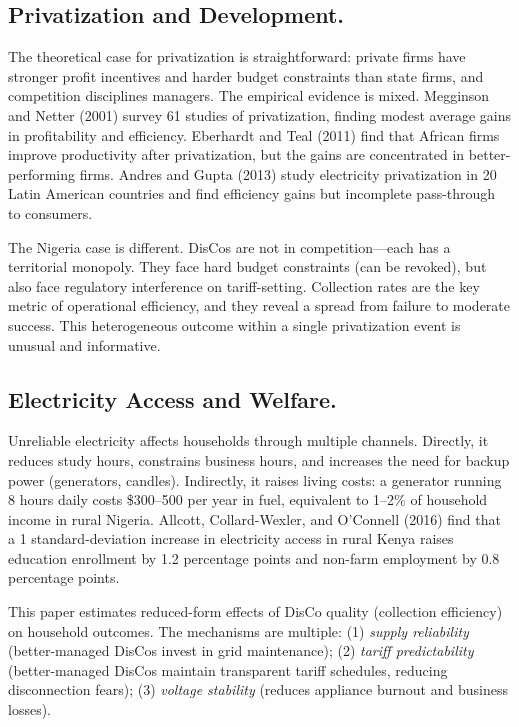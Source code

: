 \documentclass[12pt]{article}
\begin{document}
\subsection*{Privatization and Development.}
The theoretical case for privatization is straightforward: private firms have stronger profit incentives and harder budget constraints than state firms, and competition disciplines managers. The empirical evidence is mixed. Megginson and Netter (2001) survey 61 studies of privatization, finding modest average gains in profitability and efficiency. Eberhardt and Teal (2011) find that African firms improve productivity after privatization, but the gains are concentrated in better-performing firms. Andres and Gupta (2013) study electricity privatization in 20 Latin American countries and find efficiency gains but incomplete pass-through to consumers.

The Nigeria case is different. DisCos are not in competition---each has a territorial monopoly. They face hard budget constraints (can be revoked), but also face regulatory interference on tariff-setting. Collection rates are the key metric of operational efficiency, and they reveal a spread from failure to moderate success. This heterogeneous outcome within a single privatization event is unusual and informative.

\subsection*{Electricity Access and Welfare.}
Unreliable electricity affects households through multiple channels. Directly, it reduces study hours, constrains business hours, and increases the need for backup power (generators, candles). Indirectly, it raises living costs: a generator running 8 hours daily costs \$300--500 per year in fuel, equivalent to 1--2\% of household income in rural Nigeria. Allcott, Collard-Wexler, and O'Connell (2016) find that a 1 standard-deviation increase in electricity access in rural Kenya raises education enrollment by 1.2 percentage points and non-farm employment by 0.8 percentage points.

This paper estimates reduced-form effects of DisCo quality (collection efficiency) on household outcomes. The mechanisms are multiple: (1) \textit{supply reliability} (better-managed DisCos invest in grid maintenance); (2) \textit{tariff predictability} (better-managed DisCos maintain transparent tariff schedules, reducing disconnection fears); (3) \textit{voltage stability} (reduces appliance burnout and business losses).
\end{document}
